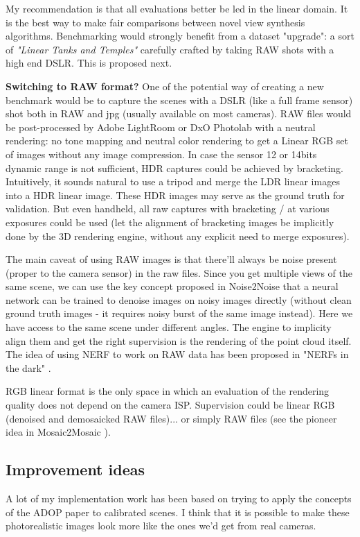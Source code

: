 \noindent My recommendation is that all evaluations better be led in the linear domain. It is the best way to make fair comparisons between novel view synthesis algorithms. Benchmarking would strongly benefit from a dataset "upgrade": a sort of \textit{"Linear Tanks and Temples"} carefully crafted by taking RAW shots with a high end DSLR. This is proposed next.

\noindent \textbf{Switching to RAW format?} 
One of the potential way of creating a new benchmark would be to capture the scenes with a DSLR (like a full frame sensor) shot both in RAW and jpg (usually available on most cameras). RAW files would be post-processed by Adobe LightRoom or DxO Photolab with a neutral rendering: no tone mapping and neutral color rendering to get a Linear RGB set of images without any image compression. In case the sensor 12 or 14bits dynamic range is not sufficient, HDR captures could be achieved by bracketing. Intuitively, it sounds natural to use a tripod and merge the LDR linear images into a HDR linear image. These HDR images may serve as the ground truth for validation.
\noindent But even handheld, all raw captures with bracketing / at various exposures could be used (let the alignment of bracketing images be implicitly done by the 3D rendering engine, without any explicit need to merge exposures).

The main caveat of using RAW images is that there'll always be noise present (proper to the camera sensor) in the raw files. Since you get multiple views of the same scene, we can use the key concept proposed in Noise2Noise \cite{lehtinen2018noise2noise} that a neural network can be trained to denoise images on noisy images directly (without clean ground truth images - it requires noisy burst of the same image instead). Here we have access to the same scene under different angles. The engine to implicity align them and get the right supervision is the rendering of the point cloud itself. The idea of using NERF to work on RAW data has been proposed in "NERFs in the dark" \cite{mildenhall2022rawnerf}.


\noindent RGB linear format is the only space in which an evaluation of the rendering quality does not depend on the camera ISP. Supervision could be linear RGB (denoised and demosaicked RAW files)... or simply RAW files (see the pioneer idea in Mosaic2Mosaic \cite{ehret2019joint}).


\subsection{Improvement ideas}
\label{subsec:improvement_ideas}
A lot of my implementation work has been based on trying to apply the concepts of the ADOP paper to calibrated scenes. I think that it is possible to make these photorealistic images look more like the ones we'd get from real cameras.

